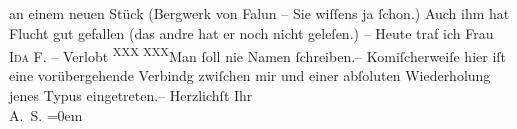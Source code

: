 \begin{ledgroupsized}[t]{13cm}
               an einem neuen Stück (Bergwerk von Falun – Sie
               wiſſens ja ſchon.) Auch ihm hat Flucht gut
               gefallen \strikeout{(} (das andre hat er noch nicht geleſen.) – \pend
           \pstart
           Heute traf ich Frau \textsc{Ida {\pb}F.} – Verlobt \substVorne{}\textsuperscript{XXX XXX}{\allowbreak}\substDazwischen{}Man ſoll nie Namen ſchreiben\substHinten{}.– Komiſcherweiſe hier iſt eine vorübergehende Verbindg zwiſchen
               mir und einer abſoluten Wiederholung jenes Typus eingetreten.–\pend
           \pstart
           Herzlichſt Ihr{\\[\baselineskip]}\spacefill\mbox{A. S.}\pend
           \leftskip=0em{}
         
         \endnumbering{}\end{ledgroupsized}\begin{anhang}\end{anhang}\newcommand{\dateiname}{L02967}\newcommand{\titel}{Arthur Schnitzler an Felix Salten, 4. 9. 1899}\newcommand{\editorInnen}{Martin Anton Müller und Laura Untner}
      